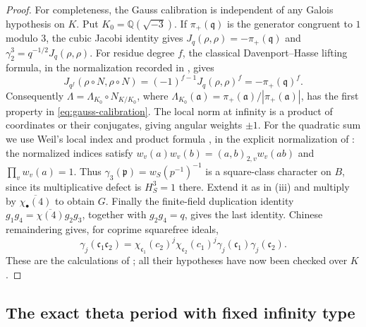 \documentclass[11pt,a4paper]{article}
\numberwithin{equation}{section}
\theoremstyle{definition}
\theoremstyle{remark}
\begin{document}
\begin{proof}
For completeness, the Gauss calibration is independent of any Galois
hypothesis on $K$.  Put $K_0=\mathbb Q(\sqrt{-3})$.  If
$\pi_+(\mathfrak q)$ is the generator congruent to $1$ modulo $3$, the
cubic Jacobi identity gives
$J_{q}(\rho,\rho)=-\pi_+(\mathfrak q)$ and
$\gamma_2^3=q^{-1/2}J_q(\rho,\rho)$.
For residue degree $f$, the classical Davenport--Hasse lifting formula,
in the normalization recorded in \cite[Theorem~1.1]{HK}, gives
\[
 J_{q^f}(\rho\circ N,\rho\circ N)
   =(-1)^{f-1}J_q(\rho,\rho)^f=-\pi_+(\mathfrak q)^f.
\]
Consequently $\Lambda=\Lambda_{K_0}\circ N_{K/K_0}$, where
$\Lambda_{K_0}(\mathfrak a)=\pi_+(\mathfrak a)/|\pi_+(\mathfrak a)|$,
has the first property in \eqref{eq:gauss-calibration}.  The local norm
at infinity is a product of coordinates or their conjugates, giving
angular weights $\pm1$.  For the quadratic sum we use Weil's local
index and product formula \cite[Chapter~II]{Weil}, in the explicit
normalization of \cite[Lemma~3.4, equation~(3.13)]{P}:
the normalized indices satisfy
$w_v(a)w_v(b)=(a,b)_{2,v}w_v(ab)$ and $\prod_vw_v(a)=1$.
Thus $\gamma_3(\mathfrak p)=w_S(p^{-1})^{-1}$ is a square-class
character on $B$, since its multiplicative defect is $H_S^3=1$ there.
Extend it as in (iii) and multiply by $\overline{\chi_\bullet(4)}$ to
obtain $G$.  Finally the finite-field duplication identity
$g_1g_4=\overline{\chi(4)}g_2g_3$, together with $g_2g_4=q$, gives the
last identity.  Chinese remaindering gives, for coprime squarefree ideals,
\begin{equation}\label{eq:gauss-crt}
 \gamma_j(\mathfrak c_1\mathfrak c_2)
 =\chi_{\mathfrak c_1}(c_2)^j\chi_{\mathfrak c_2}(c_1)^j
      \gamma_j(\mathfrak c_1)\gamma_j(\mathfrak c_2).
\end{equation}
These are the calculations of \cite[Lemmas~3.2--3.4]{P}; all their
hypotheses have now been checked over $K$.
\end{proof}

\subsection{The exact theta period with fixed infinity type}
\end{document}
